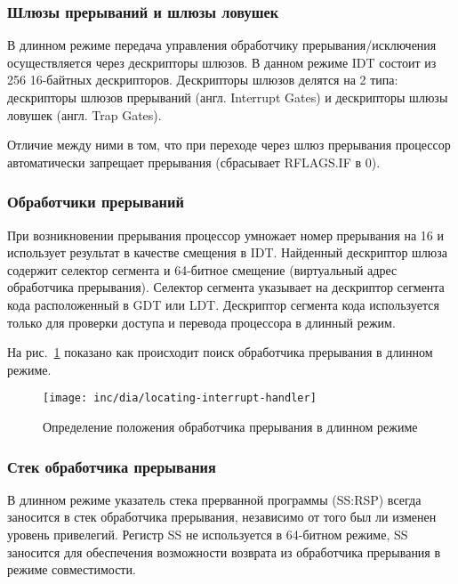 \subsubsection*{Шлюзы прерываний и шлюзы ловушек}
В длинном режиме передача управления обработчику прерывания/исключения
осуществляется через дескрипторы шлюзов. В данном режиме IDT состоит из 256
16-байтных дескрипторов. Дескрипторы шлюзов делятся на 2 типа: дескрипторы шлюзов
прерываний (англ. Interrupt Gates) и дескрипторы шлюзы ловушек (англ. Trap Gates).

Отличие между ними в том, что при переходе через шлюз прерывания процессор
автоматически запрещает прерывания (сбрасывает RFLAGS.IF в 0).

\subsubsection*{Обработчики прерываний}
При возникновении прерывания процессор умножает номер прерывания на 16 и
использует результат в качестве смещения в IDT. Найденный дескриптор шлюза
содержит селектор сегмента и 64-битное смещение (виртуальный адрес обработчика
прерывания). Селектор сегмента указывает на дескриптор сегмента кода
расположенный в GDT или LDT. Дескриптор сегмента кода используется только для
проверки доступа и перевода процессора в длинный режим.

На рис.~\ref{fig:locating_interrupt_handler} показано как происходит поиск
обработчика прерывания в длинном режиме.

\begin{figure}[ht!]
  \centering
  \texttt{[image: inc/dia/locating-interrupt-handler]}
  \caption{Определение положения обработчика прерывания в длинном режиме}
  \label{fig:locating_interrupt_handler}
\end{figure}


\subsubsection*{Стек обработчика прерывания}
В длинном режиме указатель стека прерванной программы (SS:RSP) всегда заносится в
стек обработчика прерывания, независимо от того был ли изменен уровень
привелегий. Регистр SS не используется в 64-битном режиме, SS заносится для
обеспечения возможности возврата из обработчика прерывания в режиме
совместимости.


